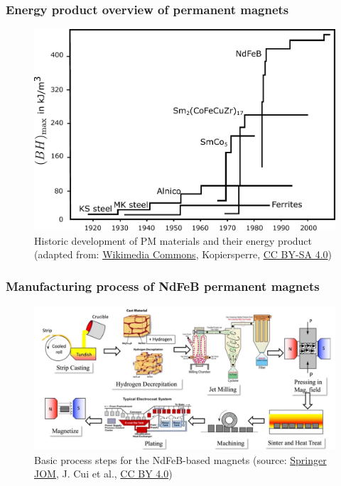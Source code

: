 \begin{frame}
	\frametitle{Energy product overview of permanent magnets}
        \begin{figure}
            \centering
            \includegraphics[height=0.65\textheight]{fig/lec02/PM_energy_product.pdf}
            \caption{Historic development of PM materials and their energy product (adapted from: \href{https://commons.wikimedia.org/wiki/File:Magnetische_Energiedichte.svg}{Wikimedia Commons}, Kopiersperre, \href{https://creativecommons.org/licenses/by-sa/4.0/deed.en}{CC BY-SA 4.0})}
        \end{figure}
\end{frame}


\begin{frame}
	\frametitle{Manufacturing process of NdFeB permanent magnets}
        \begin{figure}
            \centering
            \includegraphics[height=0.65\textheight]{fig/lec02/Production_process_NdFeB_magnets.png}
            \caption{Basic process steps for the NdFeB-based magnets (source: \href{https://link.springer.com/article/10.1007/S11837-022-05156-9}{Springer JOM}, J. Cui et al., \href{https://creativecommons.org/licenses/by/4.0/}{CC BY 4.0})}
        \end{figure}
\end{frame}

